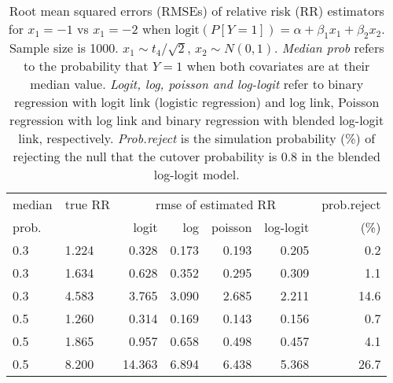 \documentclass[12pt,a4paper]{article}
\begin{document}
\begin{table}[H] 
\small\sf\centering 
\caption{Root mean squared errors (RMSEs) of relative risk (RR) estimators for $x_1=-1$ vs $x_1=-2$ when $\mbox{logit}(P[Y=1])=\alpha+\beta_1 x_1 + \beta_2 x_2$. Sample size is 1000. $x_1 \sim $$t_4/\sqrt{2}$, $x_2 \sim N(0,1)$. {\it Median prob} refers to the probability that $Y=1$ when both covariates are at their median value. {\it Logit, log, poisson and log-logit} refer to binary regression with logit link (logistic regression) and log link, Poisson regression with log link and binary regression with blended log-logit link, respectively. {\it Prob.reject} is the simulation probability (\%) of rejecting the null that the cutover probability is $0.8$ in the blended log-logit model.} 
\begin{tabular}{llrrrrr} 
\toprule 
median & true RR & \multicolumn{4}{c}{rmse of estimated RR} & prob.reject \\ 
prob. & & logit & log & poisson & log-logit  & (\%) \\ \midrule 
0.3 & 1.224 &  0.328 & 0.173 & 0.193 & 0.205 &  0.2 \\  
0.3 & 1.634 &  0.628 & 0.352 & 0.295 & 0.309 &  1.1 \\  
0.3 & 4.583 &  3.765 & 3.090 & 2.685 & 2.211 & 14.6 \\  
0.5 & 1.260 &  0.314 & 0.169 & 0.143 & 0.156 &  0.7 \\  
0.5 & 1.865 &  0.957 & 0.658 & 0.498 & 0.457 &  4.1 \\  
0.5 & 8.200 & 14.363 & 6.894 & 6.438 & 5.368 & 26.7 \\  
\bottomrule 
\end{tabular} 
\end{table} 
\end{document}
